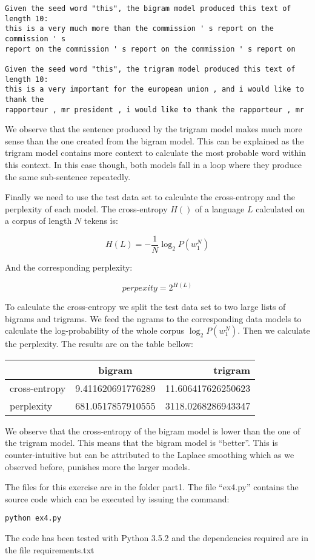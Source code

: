 \documentclass[a4paper]{article}
\begin{document}
\begin{lstlisting}
Given the seed word "this", the bigram model produced this text of length 10:
this is a very much more than the commission ' s report on the commission ' s 
report on the commission ' s report on the commission ' s report on

Given the seed word "this", the trigram model produced this text of length 10:
this is a very important for the european union , and i would like to thank the
rapporteur , mr president , i would like to thank the rapporteur , mr
\end{lstlisting}

We observe that the sentence produced by the trigram model makes much more sense
than the one created from the bigram model. This can be explained as the trigram
model contains more context to calculate the most probable word within this
context. In this case though, both models fall in a loop where they produce the
same sub-sentence repeatedly.

Finally we need to use the test data set to calculate the cross-entropy and the
perplexity of each model. The cross-entropy $H()$ of a language $L$
calculated on a corpus of length $N$ tekens is:

$$
H(L) = -\frac{1}{N}\log_2{P(w_1^N)}
$$

And the corresponding perplexity:

$$
perpexity = 2^{H(L)}
$$

To calculate the cross-entropy we split the test data set to two large lists of
bigrams and trigrams. We feed the ngrams to the corresponding data models to
calculate the log-probability of the whole corpus $\log_2P(w_1^N)$. Then we
calculate the perplexity. The results are on the table bellow:

\begin{center}
  \begin{tabular}{ l || c | r }
    \hline
      & bigram & trigram \\ \hline
    cross-entropy & 9.411620691776289 & 11.606417626250623 \\ \hline
    perplexity & 681.0517857910555 & 3118.0268286943347 \\
    \hline
  \end{tabular}
\end{center}

We observe that the cross-entropy of the bigram model is lower than the one of
the trigram model. This means that the bigram model is ``better''. This is
counter-intuitive but can be attributed to the Laplace smoothing which as we
observed before, punishes more the larger models.

The files for this exercise are in the folder part1. The file ``ex4.py''
contains the source code which can be executed by issuing the command:

\begin{lstlisting}
python ex4.py
\end{lstlisting}

The code has been tested with Python 3.5.2 and the dependencies required are in
the file requirements.txt
\end{document}
